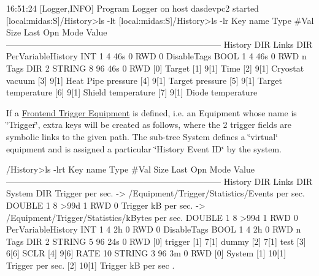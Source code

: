 \begin{DoxyCode}
16:51:24 [Logger,INFO] Program Logger on host dasdevpc2 started
[local:midas:S]/History>ls -lt
[local:midas:S]/History>ls -lr
Key name                        Type    #Val  Size  Last Opn Mode Value
---------------------------------------------------------------------------
History                         DIR
    Links                       DIR
    PerVariableHistory          INT     1     4     46s  0   RWD  0
    DisableTags                 BOOL    1     4     46s  0   RWD  n
    Tags                        DIR
        2                       STRING  8     96    46s  0   RWD
                                        [0]             Target
                                        [1]             9[1] Time
                                        [2]             9[1] Cryostat vacuum
                                        [3]             9[1] Heat Pipe pressure
                                        [4]             9[1] Target pressure
                                        [5]             9[1] Target temperature
                                        [6]             9[1] Shield temperature
                                        [7]             9[1] Diode temperature
\end{DoxyCode}


If a \hyperlink{FE_eqdec}{Frontend Trigger Equipment} is defined, i.e. an Equipment whose name is \char`\"{}Trigger\char`\"{}, extra keys will be created as follows, where the 2 trigger fields are symbolic links to the given path. The sub-\/tree System defines a \char`\"{}virtual\char`\"{} equipment and is assigned a particular \char`\"{}History Event ID\char`\"{} by the system.


\begin{DoxyCode}
/History>ls -lrt
Key name                        Type    #Val  Size  Last Opn Mode Value
---------------------------------------------------------------------------
History                         DIR
    Links                       DIR
        System                  DIR
            Trigger per sec. -> /Equipment/Trigger/Statistics/Events per sec.
                                DOUBLE  1     8     >99d 1   RWD  0
            Trigger kB per sec. -> /Equipment/Trigger/Statistics/kBytes per sec.
                                DOUBLE  1     8     >99d 1   RWD  0
    PerVariableHistory          INT     1     4     2h   0   RWD  0
    DisableTags                 BOOL    1     4     2h   0   RWD  n
    Tags                        DIR
        2                       STRING  5     96    24s  0   RWD
                                        [0]             trigger
                                        [1]             7[1] dummy
                                        [2]             7[1] test
                                        [3]             6[6] SCLR
                                        [4]             9[6] RATE
        10                      STRING  3     96    3m   0   RWD
                                        [0]             System
                                        [1]             10[1] Trigger per sec.
                                        [2]             10[1] Trigger kB per sec 
                                        .
\end{DoxyCode}


